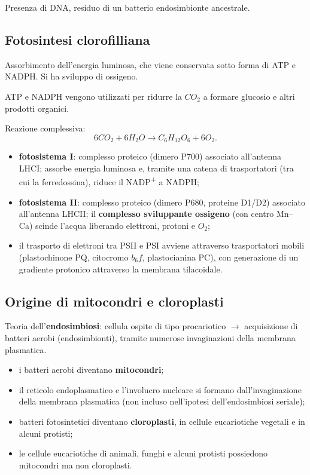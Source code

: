 Presenza di DNA, residuo di un batterio endosimbionte ancestrale.

\subsection{Fotosintesi clorofilliana}

Assorbimento dell'energia luminosa, che viene conservata sotto forma di ATP e NADPH. Si ha sviluppo di ossigeno.

ATP e NADPH vengono utilizzati per ridurre la $CO_2$ a formare glucosio e altri prodotti organici.

Reazione complessiva:
\[
6CO_2 + 6H_2O \rightarrow C_6H_{12}O_6 + 6O_2.
\]

\begin{itemize}
  \item \textbf{fotosistema I}: complesso proteico (dimero P700) associato all'antenna LHCI; assorbe energia luminosa e, tramite una catena di trasportatori (tra cui la ferredossina), riduce il NADP\textsuperscript{+} a NADPH;
  \item \textbf{fotosistema II}: complesso proteico (dimero P680, proteine D1/D2) associato all'antenna LHCII; il \textbf{complesso sviluppante ossigeno} (con centro Mn--Ca) scinde l'acqua liberando elettroni, protoni e $O_2$;
  \item il trasporto di elettroni tra PSII e PSI avviene attraverso trasportatori mobili (plastochinone PQ, citocromo $b_6f$, plastocianina PC), con generazione di un gradiente protonico attraverso la membrana tilacoidale.
\end{itemize}

\subsection{Origine di mitocondri e cloroplasti}

Teoria dell'\textbf{endosimbiosi}: cellula ospite di tipo procariotico $\rightarrow$ acquisizione di batteri aerobi (endosimbionti), tramite numerose invaginazioni della membrana plasmatica.
\begin{itemize}
  \item i batteri aerobi diventano \textbf{mitocondri};
  \item il reticolo endoplasmatico e l'involucro nucleare si formano dall'invaginazione della membrana plasmatica (non incluso nell'ipotesi dell'endosimbiosi seriale);
  \item batteri fotosintetici diventano \textbf{cloroplasti}, in cellule eucariotiche vegetali e in alcuni protisti;
  \item le cellule eucariotiche di animali, funghi e alcuni protisti possiedono mitocondri ma non cloroplasti.
\end{itemize}

